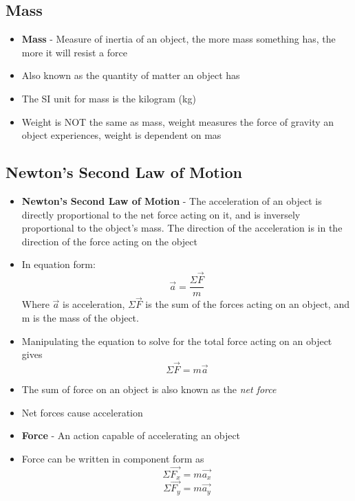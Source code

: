 \subsection{Mass}
\begin{itemize}
    \item \textbf{Mass} - Measure of inertia of an object, the more mass something has, the more it will resist a force
    \item Also known as the quantity of matter an object has
    \item The SI unit for mass is the kilogram (kg)
    \item Weight is NOT the same as mass, weight measures the force of gravity an object experiences, weight is dependent on mas
\end{itemize}

\subsection{Newton's Second Law of Motion}
\begin{itemize}
    \item \textbf{Newton's Second Law of Motion} - The acceleration of an object is directly proportional to the net force acting on it, and is inversely proportional to the object's mass. The direction of the acceleration is in the direction of the force acting on the object
    \item In equation form: \[\vec{a}=\frac{\Sigma \vec{F}}{m}\]
    Where $\vec{a}$ is acceleration, $\Sigma \vec{F}$ is the sum of the forces acting on an object, and m is the mass of the object. 
    \item Manipulating the equation to solve for the total force acting on an object gives \[\Sigma\vec{F}=m\vec{a}\]
    \item The sum of force on an object is also known as the \emph{net force} 
    \item Net forces cause acceleration
    \item \textbf{Force} - An action capable of accelerating an object
    \item Force can be written in component form as \[\Sigma\vec{F_x}=m\vec{a_x}\] \[\Sigma\vec{F_y}=m\vec{a_y}\]
\end{itemize}

